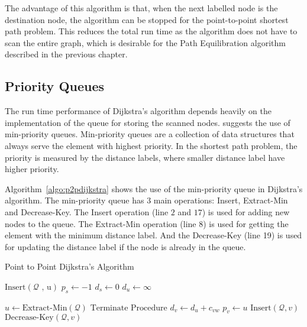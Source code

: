 The advantage of this algorithm is that,
when the next labelled node is the destination node,
the algorithm can be stopped for the point-to-point shortest path problem.
This reduces the total run time as the algorithm does not have to scan the entire graph,
which is desirable for the Path Equilibration algorithm described in the previous chapter.

\subsection{Priority Queues}
The run time performance of Dijkstra's algorithm depends heavily on the implementation of the queue for storing the scanned nodes.
\citet{Cormen} suggests the use of min-priority queues.
Min-priority queues are a collection of data structures that always serve the element with highest priority.
In the shortest path problem, the priority is measured by the distance labels, where smaller distance label have higher priority.

Algorithm~\ref{algo:p2pdijkstra} shows the use of the min-priority queue in Dijkstra's algorithm.
The min-priority queue has 3 main operations: Insert, Extract-Min and Decrease-Key.
The Insert operation (line $2$ and $17$) is used for adding new nodes to the queue.
The Extract-Min operation (line 8) is used for getting the element with the minimum distance label.
And the Decrease-Key (line 19) is used for updating the distance label if the node is already in the queue.

\begin{algorithm}[H]
    \caption{Point to Point Dijkstra's Algorithm}
    \label{algo:p2pdijkstra}
    \begin{algorithmic}[1]
        \State $\text{Insert}(\mathcal{Q}\text{ , u})$ 
        \State $p_s \gets -1$ 
        \State $d_s \gets 0$
         
        \State $d_u \gets \infty$
    \EndFor

    \State $ u \gets \text{Extract-Min}(\mathcal{Q}) $ 
    \State $\text{Terminate Procedure}$ 
\EndIf
{}
 
\State $d_v \gets d_u + c_{vw}$
\State $p_v \gets u$
\State $\text{Insert}(\mathcal{Q}, v)$ 
\Else
\State $\text{Decrease-Key}(\mathcal{Q}, v)$ 
    \EndIf
\EndIf
                \EndFor
            \EndIf
        \EndWhile
    \EndProcedure
\end{algorithmic}
\end{algorithm}

